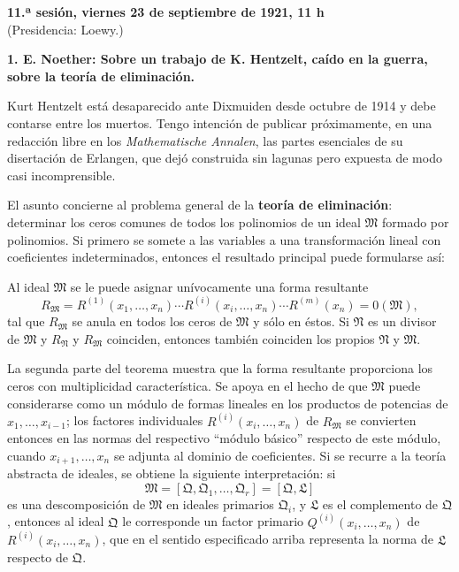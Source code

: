 \begin{center}
\textbf{11.ª sesión, viernes 23 de septiembre de 1921, 11 h}\\
(Presidencia: Loewy.)
\end{center}

\textbf{1. E. Noether: Sobre un trabajo de K. Hentzelt, caído en la guerra, sobre la teoría de eliminación.}

Kurt Hentzelt está desaparecido ante Dixmuiden desde octubre de 1914 y debe contarse entre los muertos. Tengo intención de publicar próximamente, en una redacción libre en los \emph{Mathematische Annalen}, las partes esenciales de su disertación de Erlangen, que dejó construida sin lagunas pero expuesta de modo casi incomprensible.

El asunto concierne al problema general de la \textbf{teoría de eliminación}: determinar los ceros comunes de todos los polinomios de un ideal $\mathfrak M$ formado por polinomios. Si primero se somete a las variables a una transformación lineal con coeficientes indeterminados, entonces el resultado principal puede formularse así:

Al ideal $\mathfrak M$ se le puede asignar unívocamente una forma resultante
\[
 R_{\mathfrak M}=R^{(1)}(x_1,
\ldots,x_n)\cdots R^{(i)}(x_i,
\ldots,x_n)\cdots R^{(m)}(x_n)=0(\mathfrak M),
\]
tal que $R_{\mathfrak M}$ se anula en todos los ceros de $\mathfrak M$ y sólo en éstos. Si $\mathfrak N$ es un divisor de $\mathfrak M$ y $R_{\mathfrak N}$ y $R_{\mathfrak M}$ coinciden, entonces también coinciden los propios $\mathfrak N$ y $\mathfrak M$.

La segunda parte del teorema muestra que la forma resultante proporciona los ceros con multiplicidad característica. Se apoya en el hecho de que $\mathfrak M$ puede considerarse como un módulo de formas lineales en los productos de potencias de $x_1,\ldots,x_{i-1}$; los factores individuales $R^{(i)}(x_i,\ldots,x_n)$ de $R_{\mathfrak M}$ se convierten entonces en las normas del respectivo ``módulo básico'' respecto de este módulo, cuando $x_{i+1},\ldots,x_n$ se adjunta al dominio de coeficientes. Si se recurre a la teoría abstracta de ideales, se obtiene la siguiente interpretación: si
\[
 \mathfrak M=[\mathfrak Q,\mathfrak Q_1,
\ldots,
\mathfrak Q_r]=[\mathfrak Q,\mathfrak L]
\]
es una descomposición de $\mathfrak M$ en ideales primarios $\mathfrak Q_i$, y $\mathfrak L$ es el complemento de $\mathfrak Q$, entonces al ideal $\mathfrak Q$ le corresponde un factor primario $Q^{(i)}(x_i,\ldots,x_n)$ de $R^{(i)}(x_i,\ldots,x_n)$, que en el sentido especificado arriba representa la norma de $\mathfrak L$ respecto de $\mathfrak Q$.
